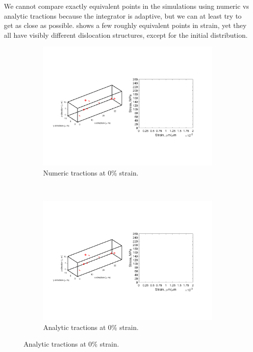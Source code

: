 We cannot compare exactly equivalent points in the simulations using numeric vs analytic tractions because the integrator is adaptive, but we can at least try to get as close as possible.  shows a few roughly equivalent points in strain, yet they all have visibly different dislocation structures, except for the initial distribution.
\begin{figure}
    \centering
    \begin{subfigure}[t]{0.45\linewidth}
        \centering
        \includegraphics[trim={1.75cm 6.75cm 15.75cm 6.75cm},clip,width=\linewidth]{../data/11-Mar-2021_numT_8_tensile_ni_100_0.pdf}
        \caption{Numeric tractions at 0\% strain.}
    \end{subfigure}
    ~
    \begin{subfigure}[t]{0.45\linewidth}
        \centering
        \includegraphics[trim={1.75cm 6.75cm 15.75cm 6.75cm},clip,width=\linewidth]{../data/11-Mar-2021_8_tensile_ni_100_0.pdf}
        \caption{Analytic tractions at 0\% strain.}
    \end{subfigure}


\end{figure}
